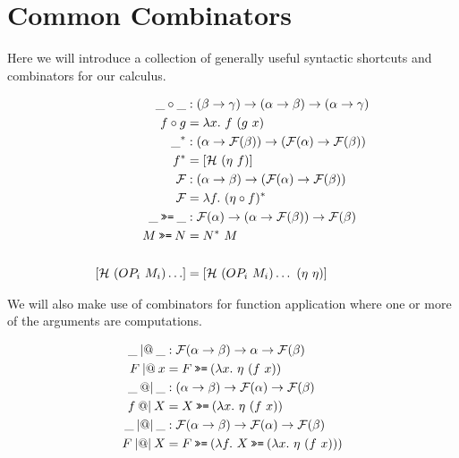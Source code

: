 \section{Common Combinators}

Here we will introduce a collection of generally useful syntactic shortcuts
and combinators for our calculus.

\begin{align*}
  \_ \circ \_ &: (\beta \to \gamma) \to (\alpha \to \beta) \to (\alpha \to \gamma) \\
  f \circ g &= \lambda x.\ f\ (g\ x) \\
  \_^* &: (\alpha \to \mathcal{F}(\beta)) \to (\mathcal{F}(\alpha) \to \mathcal{F}(\beta)) \\
  f^* &= [\mathcal{H}\ (\eta\ f)] \\
  \mathcal{F} &: (\alpha \to \beta) \to (\mathcal{F}(\alpha) \to \mathcal{F}(\beta)) \\
  \mathcal{F} &= \lambda f.\ (\eta \circ f)^* \\
  \_ \hsbind \_ &: \mathcal{F}(\alpha) \to (\alpha \to \mathcal{F}(\beta)) \to \mathcal{F}(\beta) \\
  M \hsbind N &= N^*\ M \\
  \\
  [\mathcal{H}\ (OP_i\ M_i)\ldots] &= [\mathcal{H}\ (OP_i\ M_i)\ldots\ (\eta\ \eta)]
\end{align*}

We will also make use of combinators for function application where one or
more of the arguments are computations.

\begin{align*}
  \_ \apl \_ &: \mathcal{F}(\alpha \to \beta) \to \alpha \to \mathcal{F}(\beta) \\
  F \apl x &= F \hsbind (\lambda x.\ \eta\ (f\ x)) \\
  \_ \apr \_ &: (\alpha \to \beta) \to \mathcal{F}(\alpha) \to \mathcal{F}(\beta) \\
  f \apr X &= X \hsbind (\lambda x.\ \eta\ (f\ x)) \\
  \_ \ap \_ &: \mathcal{F}(\alpha \to \beta) \to \mathcal{F}(\alpha) \to \mathcal{F}(\beta) \\
  F \ap X &= F \hsbind (\lambda f.\ X \hsbind (\lambda x.\ \eta\ (f\ x)))
\end{align*}
